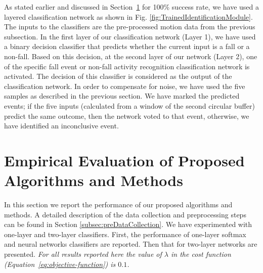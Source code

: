 \documentclass[]{IEEEtran}
\begin{document}
As stated earlier and discussed in Section~\ref{Evaluation} for 100\% success rate, we have used a layered classification network as 
shown in Fig. \ref{fig:TrainedIdentificationModule}. The inputs to the classifiers are 
the 
pre-processed motion data from the previous subsection. In the first layer of our 
classification network (Layer 1), we have used a binary decision classifier that predicts 
whether the current input is a fall or a non-fall. Based on this decision, at the second 
layer of our network (Layer 2), one of the specific fall event or non-fall activity 
recognition classification network is activated. The decision of this classifier is 
considered as the output of the classification network. In order to compensate for noise, 
we have used the five samples as described in the previous section. We have marked the 
predicted events; if the five inputs (calculated from a window of the second circular 
buffer) 
predict the same outcome, then the network voted 
to that event, otherwise, we have identified an inconclusive event. 



\section{Empirical Evaluation of Proposed Algorithms and Methods}
\label{Evaluation}

In this section we report the performance of our proposed algorithms and methods. A detailed description of the data collection and preprocessing steps can be found in Section \ref{subsec:preDataCollection}.
We have experimented with one-layer and two-layer classifiers.  First, the performance of one-layer softmax and neural networks classifiers are reported. Then that for two-layer networks are presented. 
\emph{For all results reported here the value of $\lambda$ in the cost function 
(Equation~\ref{eq:objective-function}) is $0.1$.}
\end{document}
